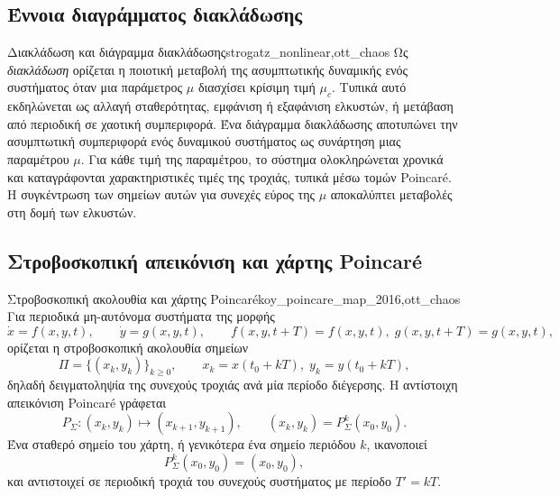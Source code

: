 \documentclass[11pt,a4paper]{report}
\begin{document}
\subsection{Έννοια διαγράμματος διακλάδωσης}
\begin{definitionbox}{Διακλάδωση και διάγραμμα διακλάδωσης}{strogatz_nonlinear,ott_chaos}
Ως \emph{διακλάδωση} ορίζεται η ποιοτική μεταβολή της ασυμπτωτικής δυναμικής ενός συστήματος όταν μια παράμετρος $\mu$ διασχίσει κρίσιμη τιμή $\mu_c$.
Τυπικά αυτό εκδηλώνεται ως αλλαγή σταθερότητας, εμφάνιση ή εξαφάνιση ελκυστών, ή μετάβαση από περιοδική σε χαοτική συμπεριφορά.
Ένα διάγραμμα διακλάδωσης αποτυπώνει την ασυμπτωτική συμπεριφορά ενός δυναμικού συστήματος ως συνάρτηση μιας παραμέτρου $\mu$.
Για κάθε τιμή της παραμέτρου, το σύστημα ολοκληρώνεται χρονικά και καταγράφονται χαρακτηριστικές τιμές της τροχιάς,
τυπικά μέσω τομών Poincaré. Η συγκέντρωση των σημείων αυτών για συνεχές εύρος της $\mu$ αποκαλύπτει μεταβολές στη δομή των ελκυστών.
\end{definitionbox}

\subsection{Στροβοσκοπική απεικόνιση και χάρτης Poincaré}
\label{subsec:poincare-map-theory}

\begin{definitionbox}{Στροβοσκοπική ακολουθία και χάρτης Poincaré}{koy_poincare_map_2016,ott_chaos}
Για περιοδικά μη-αυτόνομα συστήματα της μορφής
\begin{equation}
\dot{x}=f(x,y,t),\qquad \dot{y}=g(x,y,t),\qquad
f(x,y,t+T)=f(x,y,t),\; g(x,y,t+T)=g(x,y,t),
\end{equation}
ορίζεται η στροβοσκοπική ακολουθία σημείων
\begin{equation}
\Pi=\{(x_k,y_k)\}_{k\ge 0},\qquad
x_k=x(t_0+kT),\; y_k=y(t_0+kT),
\end{equation}
δηλαδή δειγματοληψία της συνεχούς τροχιάς ανά μία περίοδο διέγερσης.
Η αντίστοιχη απεικόνιση Poincaré γράφεται
\begin{equation}
P_\Sigma:(x_k,y_k)\mapsto(x_{k+1},y_{k+1}),
\qquad
(x_k,y_k)=P_\Sigma^k(x_0,y_0).
\end{equation}
Ένα σταθερό σημείο του χάρτη, ή γενικότερα ένα σημείο περιόδου $k$,
ικανοποιεί
\begin{equation}
P_\Sigma^k(x_0,y_0)=(x_0,y_0),
\end{equation}
και αντιστοιχεί σε περιοδική τροχιά του συνεχούς συστήματος με περίοδο
$T'=kT$.
\end{definitionbox}
\end{document}
